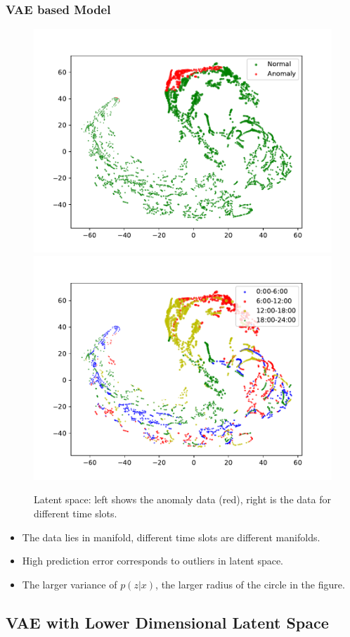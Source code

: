 \documentclass{beamer}
\begin{document}
\begin{frame}
\frametitle{VAE based Model}
\begin{figure}
\includegraphics[width=0.45\linewidth]{figs/vae_h20_latent_anomaly.pdf}
\includegraphics[width=0.45\linewidth]{figs/vae_h20_latent_time.pdf}
\vspace{-0.2in}
\caption{Latent space: left shows the anomaly data (red), right is the data for different time slots.}
\end{figure}
\vspace{-0.1in}

\begin{itemize}
\setlength\itemsep{0em}
\item The data lies in manifold, different time slots are different manifolds.
\item High prediction error corresponds to outliers in latent space.
\item The larger variance of $p(z|x)$, the larger radius of the circle in the figure.
\end{itemize}
\end{frame}


\subsection{VAE with Lower Dimensional Latent Space}
\end{document}
